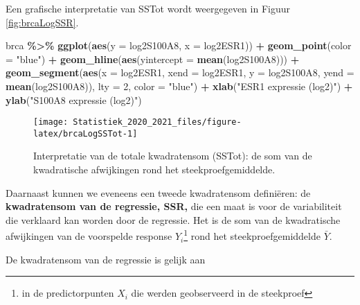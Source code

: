 \documentclass[
  12pt,dutch,coursenotes]{book}
\newenvironment{Shaded}{\begin{snugshade}}{\end{snugshade}}
\newcommand{\DataTypeTok}[1]{\textcolor[rgb]{0.13,0.29,0.53}{#1}}
\newcommand{\DecValTok}[1]{\textcolor[rgb]{0.00,0.00,0.81}{#1}}
\newcommand{\KeywordTok}[1]{\textcolor[rgb]{0.13,0.29,0.53}{\textbf{#1}}}
\newcommand{\NormalTok}[1]{#1}
\newcommand{\OperatorTok}[1]{\textcolor[rgb]{0.81,0.36,0.00}{\textbf{#1}}}
\newcommand{\StringTok}[1]{\textcolor[rgb]{0.31,0.60,0.02}{#1}}
\theoremstyle{definition}
\theoremstyle{definition}
\theoremstyle{definition}
\theoremstyle{remark}
\begin{document}
Een grafische interpretatie van SSTot wordt weergegeven in Figuur \ref{fig:brcaLogSSR}.

\begin{Shaded}
\begin{Highlighting}[]
\NormalTok{brca }\OperatorTok{\%\textgreater{}\%}\StringTok{ }\KeywordTok{ggplot}\NormalTok{(}\KeywordTok{aes}\NormalTok{(}\DataTypeTok{y =}\NormalTok{ log2S100A8, }\DataTypeTok{x =}\NormalTok{ log2ESR1)) }\OperatorTok{+}\StringTok{ }
\StringTok{    }\KeywordTok{geom\_point}\NormalTok{(}\DataTypeTok{color =} \StringTok{"blue"}\NormalTok{) }\OperatorTok{+}\StringTok{ }\KeywordTok{geom\_hline}\NormalTok{(}\KeywordTok{aes}\NormalTok{(}\DataTypeTok{yintercept =} \KeywordTok{mean}\NormalTok{(log2S100A8))) }\OperatorTok{+}\StringTok{ }
\StringTok{    }\KeywordTok{geom\_segment}\NormalTok{(}\KeywordTok{aes}\NormalTok{(}\DataTypeTok{x =}\NormalTok{ log2ESR1, }\DataTypeTok{xend =}\NormalTok{ log2ESR1, }
        \DataTypeTok{y =}\NormalTok{ log2S100A8, }\DataTypeTok{yend =} \KeywordTok{mean}\NormalTok{(log2S100A8)), }\DataTypeTok{lty =} \DecValTok{2}\NormalTok{, }
        \DataTypeTok{color =} \StringTok{"blue"}\NormalTok{) }\OperatorTok{+}\StringTok{ }\KeywordTok{xlab}\NormalTok{(}\StringTok{"ESR1 expressie (log2)"}\NormalTok{) }\OperatorTok{+}\StringTok{ }
\StringTok{    }\KeywordTok{ylab}\NormalTok{(}\StringTok{"S100A8 expressie (log2)"}\NormalTok{)}
\end{Highlighting}
\end{Shaded}

\begin{figure}

{\centering \texttt{[image: Statistiek\_2020\_2021\_files/figure-latex/brcaLogSSTot-1]} 

}

\caption{Interpretatie van de totale kwadratensom (SSTot): de som van de kwadratische afwijkingen rond het steekproefgemiddelde.}\label{fig:brcaLogSSTot}
\end{figure}

Daarnaast kunnen we eveneens een tweede kwadratensom definiëren: de \textbf{kwadratensom van de regressie, SSR,} die een maat is voor de variabiliteit die verklaard kan worden door de regressie. Het is de som van de kwadratische afwijkingen van de voorspelde response \(\hat{Y}_i\)\footnote{in de predictorpunten \(X_i\) die werden geobserveerd in de steekproef} rond het steekproefgemiddelde \(\bar Y\).

De kwadratensom van de regressie is gelijk aan
\end{document}
